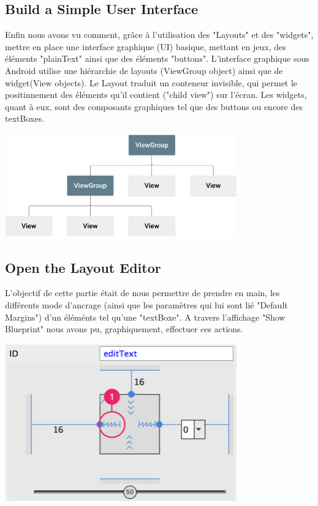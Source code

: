 \documentclass[french,a4paper,12pt]{report}
\begin{document}
\subsection{Build a Simple User Interface}

Enfin nous avons vu comment, grâce à l'utilisation des "Layouts" et des "widgets",
mettre en place une interface graphique (UI) basique, mettant en jeux, des éléments
"plainText" ainsi que des éléments "buttons".
\bigbreak
L'interface graphique sous Android utilise une hiérarchie de layouts (ViewGroup object)
ainsi que de widget(View objects).
\smallbreak
Le Layout traduit un conteneur invisible, qui
permet le positinnement des éléments qu'il contient ("child view") sur l'écran.
\smallbreak
Les widgets, quant à eux, sont des composants graphiques tel que des buttons ou
encore des textBoxes.

\includegraphics[width=10cm]{13.png}

\subsection{Open the Layout Editor}
L'objectif de cette partie était de nous permettre de prendre en main, les
différents mode d'ancrage (ainsi que les paramètres qui lui sont lié "Default
Margins") d'un éléménts tel qu'une "textBoxe". A travers l'affichage "Show
Blueprint" nous avons pu, graphiquement, effectuer ces actions.

\includegraphics[width=10cm]{131.png}
\end{document}
